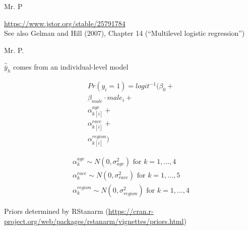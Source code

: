 \documentclass[aspectratio=169]{beamer}
\begin{document}
\begin{frame}{Mr. P}

\begin{center}
\end{center}

\vfill
\url{https://www.jstor.org/stable/25791784} \\ See also Gelman and Hill (2007), Chapter 14 (``Multilevel logistic regression'')

\end{frame}
\begin{frame}{Mr. P.}

$\hat{\bar{y}}_h$ comes from an individual-level model

\begin{align*}
Pr(y_i = 1) = logit^{-1} (\beta_0 + \\
 \beta_{male} \cdot male_i + \\
 \alpha_{k[i]}^{age} + \\
 \alpha_{k[i]}^{race} + \\
 \alpha_{k[i]}^{region})
\end{align*}

\begin{align*}
\alpha_{k}^{age} \sim N(0, \sigma^2_{age}) \text{ for } k = 1, \ldots, 4 \\
\alpha_{k}^{race} \sim N(0, \sigma^2_{race}) \text{ for } k = 1, \ldots, 5 \\
\alpha_{k}^{region}  \sim N(0, \sigma^2_{region}) \text{ for } k = 1, \ldots, 4
\end{align*}

Priors determined by RStanarm (\url{https://cran.r-project.org/web/packages/rstanarm/vignettes/priors.html})

\end{frame}
\end{document}
